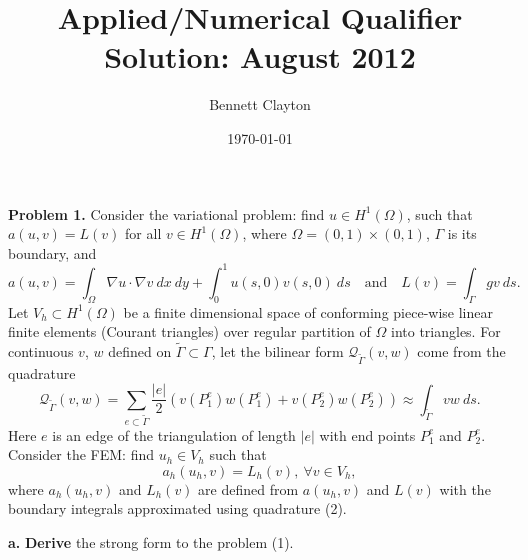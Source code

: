 \documentclass[11pt]{article}
\title{Applied/Numerical Qualifier Solution: August 2012}
\author{Bennett Clayton}
\affil{Texas A\&M University}
\date{\today}
\begin{document}
\maketitle

{\bf Problem 1.} Consider the variational problem: find $u \in H^1(\Omega)$, such that $a(u,v) = L(v)$ for all $v\in H^1(\Omega)$, where $\Omega = (0,1) \times (0,1)$, $\Gamma$ is its boundary, and
\begin{equation}
a(u,v) = \int_\Omega \nabla u \cdot \nabla v \: dx \: dy + \int_0^1 u(s,0)v(s,0) \: ds \quad \text{and} \quad L(v) = \int_\Gamma gv \: ds.
\end{equation}
Let $V_h \subset H^1(\Omega)$ be a finite dimensional space of conforming piece-wise linear finite elements (Courant triangles) over regular partition of $\Omega$ into triangles. For continuous $v$, $w$ defined on $\tilde{\Gamma} \subset \Gamma$, let the bilinear form $\mathcal{Q}_{\tilde{\Gamma}} (v,w)$ come from the quadrature 
\begin{equation}
\mathcal{Q}_{\tilde{\Gamma}} (v,w) = \sum_{e\subset\tilde{\Gamma}} \frac{|e|}{2} (v(P^e_1)w(P^e_1) + v(P^e_2)w(P^e_2)) \approx \int_{\tilde{\Gamma}} vw \: ds.
\end{equation}
Here $e$ is an edge of the triangulation of length $|e|$ with end points $P^e_1$ and $P^e_2$. Consider the FEM: find $u_h \in V_h$ such that 
\begin{equation}
a_h(u_h, v) = L_h(v), \: \forall v\in V_h,
\end{equation}
where $a_h(u_h, v)$ and $L_h(v)$ are defined from $a(u_h,v)$ and $L(v)$ with the boundary integrals approximated using quadrature (2).

\vskip 1cm

{\bf a.} {\bf Derive} the strong form to the problem (1).

\vskip 1cm
\end{document}

